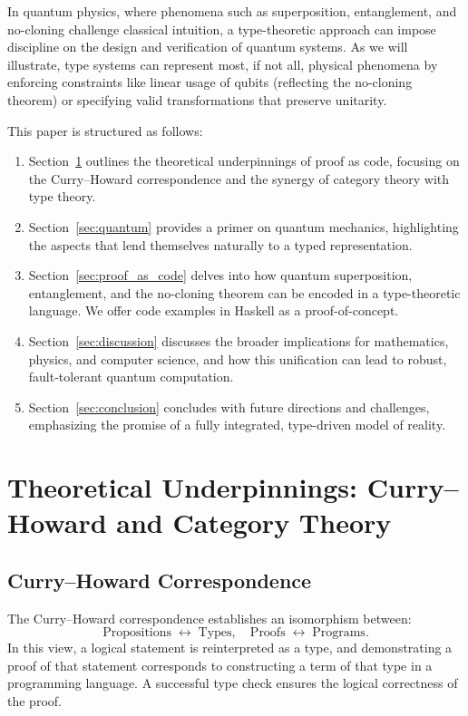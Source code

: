 \documentclass[12pt]{article}
\begin{document}
In quantum physics, where phenomena such as superposition, entanglement, and no-cloning challenge classical intuition, a type-theoretic approach can impose discipline on the design and verification of quantum systems. As we will illustrate, type systems can represent most, if not all, physical phenomena by enforcing constraints like linear usage of qubits (reflecting the no-cloning theorem) or specifying valid transformations that preserve unitarity.

This paper is structured as follows:
\begin{enumerate}[label=(\arabic*)]
    \item Section~\ref{sec:theory} outlines the theoretical underpinnings of proof as code, focusing on the Curry--Howard correspondence and the synergy of category theory with type theory.
    \item Section~\ref{sec:quantum} provides a primer on quantum mechanics, highlighting the aspects that lend themselves naturally to a typed representation.
    \item Section~\ref{sec:proof_as_code} delves into how quantum superposition, entanglement, and the no-cloning theorem can be encoded in a type-theoretic language. We offer code examples in Haskell as a proof-of-concept.
    \item Section~\ref{sec:discussion} discusses the broader implications for mathematics, physics, and computer science, and how this unification can lead to robust, fault-tolerant quantum computation.
    \item Section~\ref{sec:conclusion} concludes with future directions and challenges, emphasizing the promise of a fully integrated, type-driven model of reality.
\end{enumerate}

\section{Theoretical Underpinnings: Curry--Howard and Category Theory}
\label{sec:theory}

\subsection{Curry--Howard Correspondence}
The Curry--Howard correspondence establishes an isomorphism between:
\begin{equation*}
\text{Propositions} \;\longleftrightarrow\; \text{Types}, \quad
\text{Proofs} \;\longleftrightarrow\; \text{Programs}.
\end{equation*}
In this view, a logical statement is reinterpreted as a type, and demonstrating a proof of that statement corresponds to constructing a term of that type in a programming language. A successful type check ensures the logical correctness of the proof.
\end{document}
